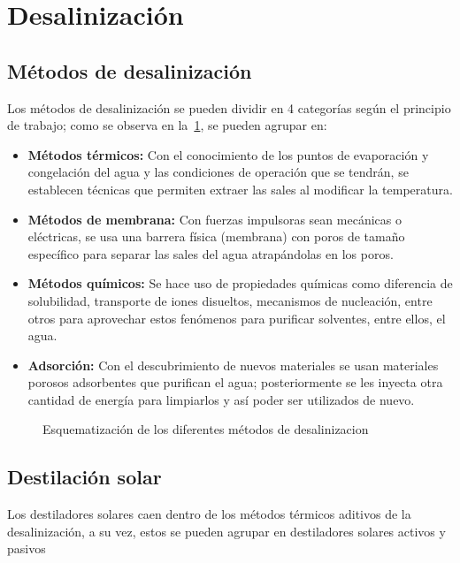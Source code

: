 \section{Desalinización}
	
	\subsection{Métodos de desalinización}
		
		Los métodos de desalinización se pueden dividir en 4 categorías según el principio de trabajo; como se observa en la~\cref{fig:métodos-desalinización}, se pueden agrupar en:
		
		\begin{itemize}
			\item \textbf{Métodos térmicos:} Con el conocimiento de los puntos de evaporación y congelación del agua y las condiciones de operación que se tendrán, se establecen técnicas que permiten extraer las sales al modificar la temperatura.
			\item \textbf{Métodos de membrana:} Con fuerzas impulsoras sean mecánicas o eléctricas, se usa una barrera física (membrana) con poros de tamaño específico para separar las sales del agua atrapándolas en los poros.
			\item \textbf{Métodos químicos:} Se hace uso de propiedades químicas como diferencia de solubilidad, transporte de iones disueltos, mecanismos de nucleación, entre otros para aprovechar estos fenómenos para purificar solventes, entre ellos, el agua.
			\item \textbf{Adsorción:} Con el descubrimiento de nuevos materiales se usan materiales porosos adsorbentes que purifican el agua; posteriormente se les inyecta otra cantidad de energía para limpiarlos y así poder ser utilizados de nuevo.
		\end{itemize}
		
		\begingroup
			\tikzexternaldisable
			\begin{figure}[H]
				\centering
				
				\caption{Esquematización de los diferentes métodos de \gls{desalinizacion}}
				\label{fig:métodos-desalinización}
			\end{figure}
			\tikzexternalenable
		\endgroup
	
	\subsection{Destilación solar}
		
		Los destiladores solares caen dentro de los métodos térmicos aditivos de la desalinización, a su vez, estos se pueden agrupar en destiladores solares activos y pasivos
		
		